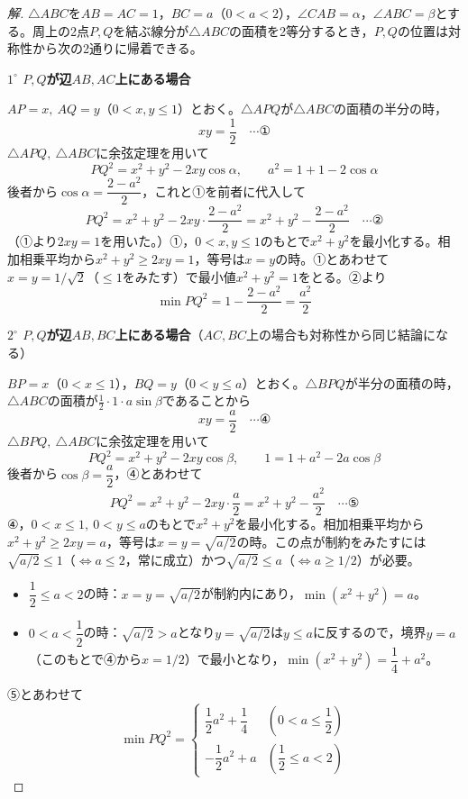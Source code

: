 \documentclass[../main.tex]{subfiles}
\begin{document}
\begin{proof}[解]
  $\triangle ABC$を$AB=AC=1$，$BC=a$（$0<a<2$），$\angle CAB=\alpha$，$\angle ABC=\beta$とする。周上の2点$P,Q$を結ぶ線分が$\triangle ABC$の面積を2等分するとき，$P,Q$の位置は対称性から次の2通りに帰着できる。

  \textbf{$1^\circ$ $P,Q$が辺$AB,AC$上にある場合}

  $AP=x,\ AQ=y$（$0<x,y\le1$）とおく。$\triangle APQ$が$\triangle ABC$の面積の半分の時，
  \[
    xy=\frac12 \quad\cdots\text{①}
  \]
  $\triangle APQ,\ \triangle ABC$に余弦定理を用いて
  \[
    PQ^2=x^2+y^2-2xy\cos\alpha,\qquad a^2=1+1-2\cos\alpha
  \]
  後者から$\cos\alpha=\dfrac{2-a^2}2$，これと①を前者に代入して
  \[
    PQ^2=x^2+y^2-2xy\cdot\frac{2-a^2}2=x^2+y^2-\frac{2-a^2}2 \quad\cdots\text{②}
  \]
  （①より$2xy=1$を用いた。）①，$0<x,y\le1$のもとで$x^2+y^2$を最小化する。相加相乗平均から$x^2+y^2\ge2xy=1$，等号は$x=y$の時。①とあわせて$x=y=1/\sqrt2$（$\le1$をみたす）で最小値$x^2+y^2=1$をとる。②より
  \[
    \min PQ^2=1-\frac{2-a^2}2=\frac{a^2}2
  \]

  \textbf{$2^\circ$ $P,Q$が辺$AB,BC$上にある場合}（$AC,BC$上の場合も対称性から同じ結論になる）

  $BP=x$（$0<x\le1$），$BQ=y$（$0<y\le a$）とおく。$\triangle BPQ$が半分の面積の時，$\triangle ABC$の面積が$\frac12\cdot1\cdot a\sin\beta$であることから
  \[
    xy=\frac a2 \quad\cdots\text{④}
  \]
  $\triangle BPQ,\ \triangle ABC$に余弦定理を用いて
  \[
    PQ^2=x^2+y^2-2xy\cos\beta,\qquad 1=1+a^2-2a\cos\beta
  \]
  後者から$\cos\beta=\dfrac a2$，④とあわせて
  \[
    PQ^2=x^2+y^2-2xy\cdot\frac a2=x^2+y^2-\frac{a^2}2 \quad\cdots\text{⑤}
  \]
  ④，$0<x\le1,\ 0<y\le a$のもとで$x^2+y^2$を最小化する。相加相乗平均から$x^2+y^2\ge2xy=a$，等号は$x=y=\sqrt{a/2}$の時。この点が制約をみたすには$\sqrt{a/2}\le1$（$\iff a\le2$，常に成立）かつ$\sqrt{a/2}\le a$（$\iff a\ge1/2$）が必要。

  \begin{itemize}
    \item $\dfrac12\le a<2$の時：$x=y=\sqrt{a/2}$が制約内にあり，$\min(x^2+y^2)=a$。
    \item $0<a<\dfrac12$の時：$\sqrt{a/2}>a$となり$y=\sqrt{a/2}$は$y\le a$に反するので，境界$y=a$（このもとで④から$x=1/2$）で最小となり，$\min(x^2+y^2)=\dfrac14+a^2$。
  \end{itemize}
  ⑤とあわせて
  \[
    \min PQ^2=
    \begin{cases}
      \dfrac12a^2+\dfrac14 & \left(0<a\le\dfrac12\right)\\[2mm]
      -\dfrac12a^2+a & \left(\dfrac12\le a<2\right)
    \end{cases}
  \]


\end{proof}
\end{document}
